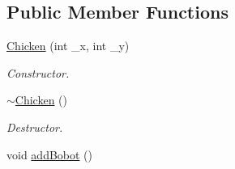 \subsection*{Public Member Functions}
\begin{DoxyCompactItemize}
\item 
\hyperlink{classChicken_a4ca0ca08ac03410d9551564b7bf77c8d}{Chicken} (int \-\_\-x, int \-\_\-y)
\begin{DoxyCompactList}\small\item\em Constructor. \end{DoxyCompactList}\item 
\hypertarget{classChicken_a467a41f21fa2b076f6f2d398c8e1ada8}{\hyperlink{classChicken_a467a41f21fa2b076f6f2d398c8e1ada8}{$\sim$\-Chicken} ()}\label{classChicken_a467a41f21fa2b076f6f2d398c8e1ada8}

\begin{DoxyCompactList}\small\item\em Destructor. \end{DoxyCompactList}\item 
\hypertarget{classChicken_acbcd8ace889db2287c8494dbd7c8a38b}{void \hyperlink{classChicken_acbcd8ace889db2287c8494dbd7c8a38b}{add\-Bobot} ()}\label{classChicken_acbcd8ace889db2287c8494dbd7c8a38b}


\end{DoxyCompactItemize}
